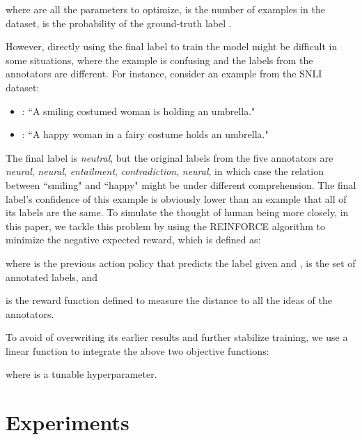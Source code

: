 \documentclass[11pt,letterpaper]{article}
\begin{document}
where  are all the parameters to optimize,  is the number of examples in the dataset,  is the probability of the ground-truth label .

However, directly using the final label to train the model might be difficult in some situations, where the example is confusing and the labels from the annotators are different. For instance, consider an example from the SNLI dataset:
\begin{itemize}
\item : ``A smiling costumed woman is holding an umbrella." 
\item  : ``A happy woman in a fairy costume holds an umbrella." 
\end{itemize}
 The final label is \emph{neutral}, but the original labels from the five annotators are \emph{neural}, \emph{neural}, \emph{entailment}, \emph{contradiction}, \emph{neural}, in which case the relation between ``smiling" and ``happy" might be under different comprehension. The final label's confidence of this example is obviously lower than an example that all of its labels are the same. To simulate the thought of human being more closely, in this paper, we tackle this problem by using the REINFORCE algorithm\cite{williams1992simple} to minimize the negative expected reward, which is defined as:

where  is the previous action policy that predicts the label given  and ,  is the set of annotated labels, and

is the reward function defined to measure the distance to all the ideas of the annotators.

To avoid of overwriting its earlier results and further stabilize training, we use a linear function to integrate the above two objective functions:

where  is a tunable hyperparameter.


\section{Experiments}
\label{sec5}
\end{document}
